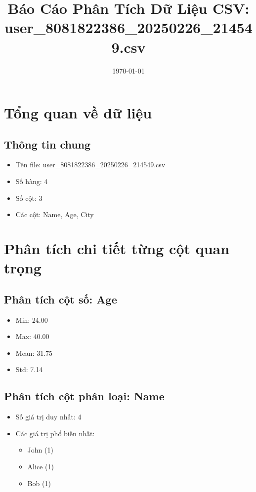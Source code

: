 \documentclass[12pt]{article}
\title{Báo Cáo Phân Tích Dữ Liệu CSV: user\_8081822386\_20250226\_214549.csv}
\author{}
\date{\today}
\begin{document}
\maketitle
\thispagestyle{empty}
\newpage

\tableofcontents
\newpage

\section{Tổng quan về dữ liệu}

\subsection{Thông tin chung}
\begin{itemize}
    \item Tên file: user\_8081822386\_20250226\_214549.csv
    \item Số hàng: 4
    \item Số cột: 3
    \item Các cột: Name, Age, City
\end{itemize}

\section{Phân tích chi tiết từng cột quan trọng}

\subsection{Phân tích cột số: Age}
\begin{itemize}
    \item Min: 24.00
    \item Max: 40.00
    \item Mean: 31.75
    \item Std: 7.14
\end{itemize}

\subsection{Phân tích cột phân loại: Name}
\begin{itemize}
    \item Số giá trị duy nhất: 4
    \item Các giá trị phổ biến nhất:
    \begin{itemize}
        \item John (1)
        \item Alice (1)
        \item Bob (1)
    \end{itemize}
\end{itemize}
\end{document}
